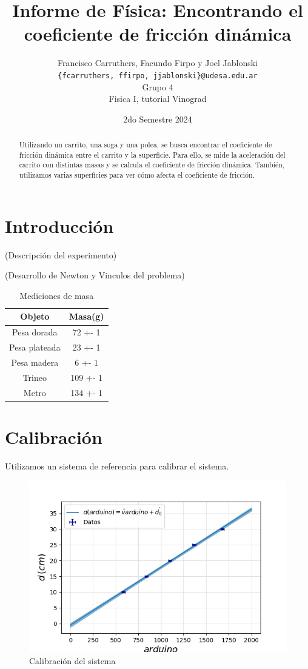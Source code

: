 \documentclass[12pt,a4]{article}
\title{Informe de Física: Encontrando el coeficiente de fricción dinámica}
\author{Francisco Carruthers, Facundo Firpo y Joel Jablonski\\ [2mm]
\small \texttt{\{fcarruthers, ffirpo, jjablonski\}@udesa.edu.ar}\\
\small Grupo 4\\
\small Fisica I, tutorial Vinograd}
\date{2do Semestre 2024}
\begin{document}
\maketitle

\begin{abstract}
    Utilizando un carrito, una soga y una polea, se busca encontrar el coeficiente de fricción dinámica entre el carrito y la superficie. Para ello, se mide la aceleración del carrito con distintas masas y se calcula el coeficiente de fricción dinámica. También, utilizamos varias superficies para ver cómo afecta el coeficiente de fricción.
\end{abstract}

\section{Introducción}

(Descripción del experimento)

(Desarrollo de Newton y Vinculos del problema)

\begin{table}
    \centering
    \begin{tabular}{|c|c|}
        \hline
        \textbf{Objeto} & \textbf{Masa(g)} \\
        \hline
        Pesa dorada & 72 +- 1 \\
        Pesa plateada & 23 +- 1 \\
        Pesa madera & 6 +- 1 \\
        Trineo & 109 +- 1 \\
        Metro & 134 +- 1 \\
        \hline
    \end{tabular}
    \caption{Mediciones de masa}
    \label{tab:mediciones}
\end{table}

\newpage
\section{Calibración}

Utilizamos un sistema de referencia para calibrar el sistema.

\begin{figure}[H]
    \centering
    \includegraphics[width=0.9\linewidth]{Calibracion.png}
    \caption{Calibración del sistema}
    \label{fig:calibracion}
\end{figure}
\end{document}
